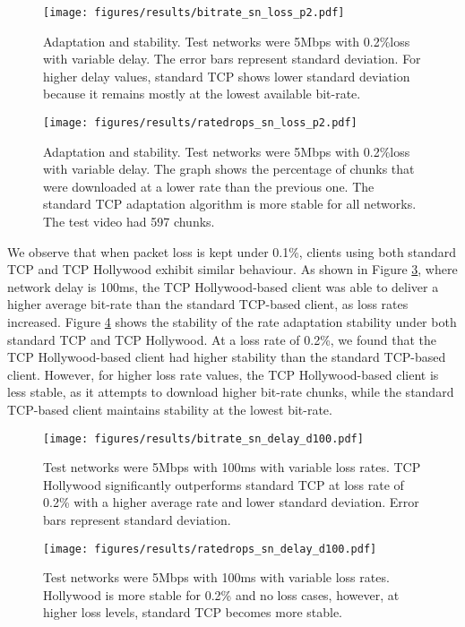 \begin{figure}
  \centering
  \texttt{[image: figures/results/bitrate\_sn\_loss\_p2.pdf]}
  \caption{Adaptation and stability. Test networks were 5Mbps with 0.2\%loss with variable 
           delay. The error bars represent standard deviation. For higher delay values, 
           standard TCP shows lower standard deviation because it remains mostly at the 
           lowest available bit-rate. }
  \label{fig:rate_delay2}
\end{figure}

\begin{figure}
  \centering
  \texttt{[image: figures/results/ratedrops\_sn\_loss\_p2.pdf]}
  \caption{Adaptation and stability. Test networks were 5Mbps with 0.2\%loss with variable 
           delay. The graph shows the percentage of chunks that were downloaded at a lower 
           rate than the previous one. The standard TCP adaptation algorithm is more stable 
           for all networks. The test video had 597 chunks.}
  \label{fig:ratechange_delay2}
\end{figure}

We observe that when packet loss is kept under 0.1\%, clients using both standard TCP and TCP 
Hollywood exhibit similar behaviour. As shown in Figure \ref{fig:rate_loss}, where network delay is 100ms, 
the TCP Hollywood-based client was able to deliver a higher average bit-rate than the standard TCP-based client, as
loss rates increased. Figure \ref{fig:ratechange_loss} shows the stability of the rate adaptation
stability under both standard TCP and TCP Hollywood. At a loss rate of 0.2\%, we found that the
TCP Hollywood-based client had higher stability than the standard TCP-based client. However,
for higher loss rate values, the TCP Hollywood-based client is less stable, as it attempts
to download higher bit-rate chunks, while the standard TCP-based client maintains stability
at the lowest bit-rate.

\begin{figure}
  \centering
  \texttt{[image: figures/results/bitrate\_sn\_delay\_d100.pdf]}
  \caption{Test networks were 5Mbps with 100ms with variable loss rates. TCP Hollywood 
           significantly outperforms standard TCP at loss rate of 0.2\% with a higher 
           average rate and lower standard deviation. Error bars represent standard deviation.}
  \label{fig:rate_loss}
\end{figure}

\begin{figure}
  \centering
  \texttt{[image: figures/results/ratedrops\_sn\_delay\_d100.pdf]}
  \caption{Test networks were 5Mbps with 100ms with variable loss rates. Hollywood is more 
           stable for 0.2\% and no loss cases, however, at higher loss levels, standard TCP 
           becomes more stable.}
  \label{fig:ratechange_loss}
\end{figure}


